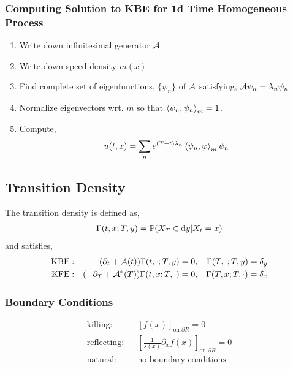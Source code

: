 \documentclass[12pt]{article}
\begin{document}
\subsubsection{Computing Solution to KBE for 1d Time Homogeneous Process}
\begin{enumerate}[nolistsep]
    \item Write down infinitesimal generator \( \mathcal{A} \)
    \item Write down speed density \( m(x) \)
    \item Find complete set of eigenfunctions, \( \{ \psi_n \} \) of \( \mathcal{A} \) satisfying, \( \mathcal{A} \psi_n = \lambda_n\psi_n \)
    \item Normalize eigenvectors wrt. \( m \) so that \( \left\langle \psi_n,\psi_n \right\rangle_m = 1 \).
    \item Compute,
        \begin{align*}
            u(t,x) = \sum_{n} e^{(T-t)\lambda_n} \left\langle \psi_n,\varphi \right\rangle_m\psi_n
        \end{align*}
\end{enumerate}

\subsection{Transition Density}
The transition density is defined as,
\begin{align*}
    \Gamma(t,x;T,y) = \mathbb{P}(X_T\in\mathrm{d} y | X_t=  x)
\end{align*}
and satisfies,
\begin{align*}
    \text{KBE}: && (\partial_t + \mathcal{A}(t)) \Gamma(t,\cdot;T,y) = 0, && \Gamma(T,\cdot;T,y) = \delta_y \\
    \text{KFE}: && (-\partial_T + \mathcal{A}^*(T)) \Gamma(t,x;T,\cdot) = 0, && \Gamma(T,x;T,\cdot) = \delta_x
\end{align*}

\subsubsection{Boundary Conditions}

\begin{align*}
    \text{killing}: && \left[ f(x) \right]_{\text{on }\partial R} = 0 \\
    \text{reflecting}: && \left[ \frac{1}{s(x)}\partial_x f(x) \right]_{\text{on }\partial R} = 0 \\
    \text{natural}: && \text{no boundary conditions}
\end{align*}
\end{document}
